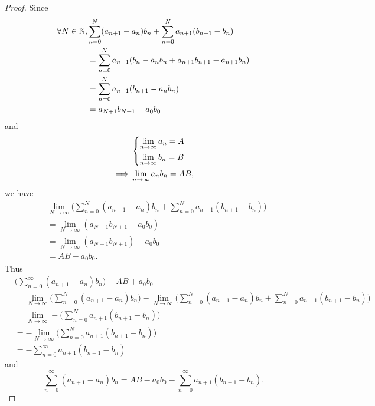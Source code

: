 \begin{proof}
  Since
  \begin{align*}
    \forall N \in \mathbb{N}, & \sum_{n = 0}^N (a_{n + 1} - a_n) b_n + \sum_{n = 0}^N a_{n + 1} (b_{n + 1} - b_n) \\
                      & = \sum_{n = 0}^N a_{n + 1} (b_n - a_n b_n + a_{n + 1} b_{n + 1} - a_{n + 1} b_n)  \\
                      & = \sum_{n = 0}^N a_{n + 1} (b_{n + 1} - a_n b_n)                                  \\
                      & = a_{N + 1} b_{N + 1} - a_0 b_0
  \end{align*}
  and
  \begin{align*}
             & \begin{dcases}
                 \lim_{n \to \infty} a_n = A \\
                 \lim_{n \to \infty} b_n = B
               \end{dcases}       \\
    \implies & \lim_{n \to \infty} a_n b_n = AB,
  \end{align*}
  we have
  \begin{align*}
     & \lim_{N \to \infty} \bigg(\sum_{n = 0}^N (a_{n + 1} - a_n) b_n + \sum_{n = 0}^N a_{n + 1} (b_{n + 1} - b_n)\bigg) \\
     & = \lim_{N \to \infty} (a_{N + 1} b_{N + 1} - a_0 b_0)                                                             \\
     & = \lim_{N \to \infty} (a_{N + 1} b_{N + 1}) - a_0 b_0                                                             \\
     & = AB - a_0 b_0.
  \end{align*}
  Thus
  \begin{align*}
     & \bigg(\sum_{n = 0}^\infty (a_{n + 1} - a_n) b_n\bigg) - AB + a_0 b_0                                                                                                                       \\
     & = \lim_{N \to \infty} \bigg(\sum_{n = 0}^N (a_{n + 1} - a_n) b_n\bigg) - \lim_{N \to \infty} \bigg(\sum_{n = 0}^N (a_{n + 1} - a_n) b_n + \sum_{n = 0}^N a_{n + 1} (b_{n + 1} - b_n)\bigg) \\
     & = \lim_{N \to \infty} - \bigg(\sum_{n = 0}^N a_{n + 1} (b_{n + 1} - b_n)\bigg)                                                                                                             \\
     & = - \lim_{N \to \infty} \bigg(\sum_{n = 0}^N a_{n + 1} (b_{n + 1} - b_n)\bigg)                                                                                                             \\
     & = - \sum_{n = 0}^\infty a_{n + 1} (b_{n + 1} - b_n)
  \end{align*}
  and
  \[
    \sum_{n = 0}^\infty (a_{n + 1} - a_n) b_n = AB - a_0 b_0 - \sum_{n = 0}^\infty a_{n + 1} (b_{n + 1} - b_n).
  \]
\end{proof}

